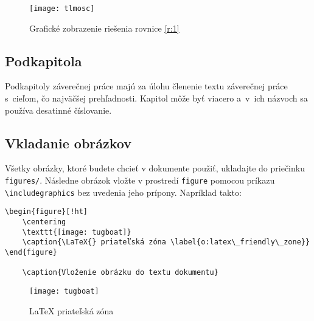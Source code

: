 \begin{figure}[ht!]
\centering
\texttt{[image: tlmosc]}
\caption{Grafické zobrazenie riešenia rovnice \ref{r:1}}\label{o:2}
\end{figure}



\subsection{Podkapitola}
Podkapitoly záverečnej práce majú za úlohu členenie textu záverečnej
práce s~cieľom, čo najväčšej prehľadnosti. Kapitol môže byť viacero
a~v~ich názvoch sa používa desatinné číslovanie.



\subsection{Vkladanie obrázkov}

Všetky obrázky, ktoré budete chcieť v dokumente použiť, ukladajte do priečinku {\tt figures/}. Následne obrázok vložte v prostredí \verb!figure! pomocou príkazu \verb!\includegraphics! bez uvedenia jeho prípony. Napríklad takto:

\begin{verbatim}
\begin{figure}[!ht]
	\centering
	\texttt{[image: tugboat]}
	\caption{\LaTeX{} priateľská zóna \label{o:latex\_friendly\_zone}}
\end{figure}

	\caption{Vloženie obrázku do textu dokumentu}
\end{verbatim}



\begin{figure}[!ht]
	\centering
	\texttt{[image: tugboat]}
	\caption{\LaTeX{} priateľská zóna \label{o:latex_friendly_zone}}
\end{figure}
